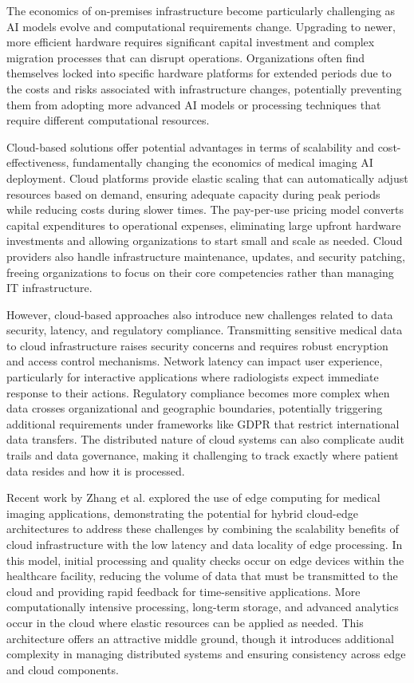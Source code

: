 \documentclass[12pt,a4paper]{article}
\begin{document}
The economics of on-premises infrastructure become particularly challenging as AI models evolve and computational requirements change. Upgrading to newer, more efficient hardware requires significant capital investment and complex migration processes that can disrupt operations. Organizations often find themselves locked into specific hardware platforms for extended periods due to the costs and risks associated with infrastructure changes, potentially preventing them from adopting more advanced AI models or processing techniques that require different computational resources.

Cloud-based solutions offer potential advantages in terms of scalability and cost-effectiveness, fundamentally changing the economics of medical imaging AI deployment. Cloud platforms provide elastic scaling that can automatically adjust resources based on demand, ensuring adequate capacity during peak periods while reducing costs during slower times. The pay-per-use pricing model converts capital expenditures to operational expenses, eliminating large upfront hardware investments and allowing organizations to start small and scale as needed. Cloud providers also handle infrastructure maintenance, updates, and security patching, freeing organizations to focus on their core competencies rather than managing IT infrastructure.

However, cloud-based approaches also introduce new challenges related to data security, latency, and regulatory compliance. Transmitting sensitive medical data to cloud infrastructure raises security concerns and requires robust encryption and access control mechanisms. Network latency can impact user experience, particularly for interactive applications where radiologists expect immediate response to their actions. Regulatory compliance becomes more complex when data crosses organizational and geographic boundaries, potentially triggering additional requirements under frameworks like GDPR that restrict international data transfers. The distributed nature of cloud systems can also complicate audit trails and data governance, making it challenging to track exactly where patient data resides and how it is processed.

Recent work by Zhang et al. \cite{zhang2020medical} explored the use of edge computing for medical imaging applications, demonstrating the potential for hybrid cloud-edge architectures to address these challenges by combining the scalability benefits of cloud infrastructure with the low latency and data locality of edge processing. In this model, initial processing and quality checks occur on edge devices within the healthcare facility, reducing the volume of data that must be transmitted to the cloud and providing rapid feedback for time-sensitive applications. More computationally intensive processing, long-term storage, and advanced analytics occur in the cloud where elastic resources can be applied as needed. This architecture offers an attractive middle ground, though it introduces additional complexity in managing distributed systems and ensuring consistency across edge and cloud components.
\end{document}
